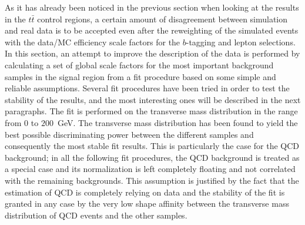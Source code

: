 As it has already been noticed in the previous section when
looking at the results in the $t\bar{t}$ control regions,
a certain amount of disagreement between simulation and
real data is to be accepted even after the reweighting
of the simulated events with the data/MC efficiency scale factors
for the $b$-tagging and lepton selections.
In this section, an attempt to improve the description of the data
is performed by calculating a set of global scale factors for the
most important background samples in the signal region
from a fit procedure based on some
simple and reliable assumptions.
Several fit procedures have been tried in order to test the stability
of the results, and the most interesting ones will be described
in the next paragraphs.
The fit is performed on the transverse mass distribution in the range
from $0$ to $200$~GeV. The transverse mass distribution has been found
to yield the best possible discriminating power between the different
samples and consequently the most stable fit results.
This is particularly the case for the QCD background;
in all the following fit procedures, the QCD background is treated as
a special case and its normalization is left completely floating
and not correlated with the remaining backgrounds.
This assumption is justified by the fact that the estimation of QCD is
completely relying on data and the stability of the fit is granted
in any case by the very low shape affinity between the
transverse mass distribution of QCD events and the other samples.

